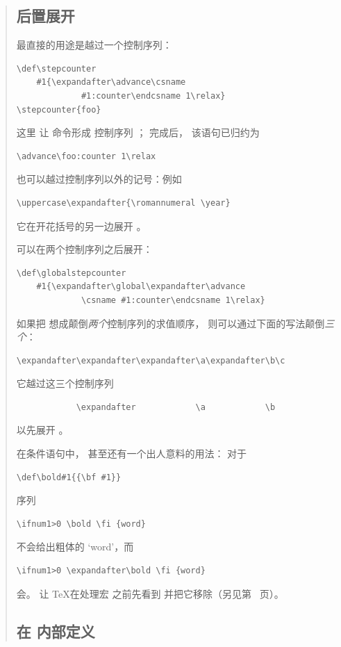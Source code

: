 \documentclass[a4paper]{rapport3}
\newenvironment{disp}{\begin{quotation}}{\end{quotation}}
\begin{document}
\begin{disp}
\subsection{后置展开}

 最直接的用途是越过一个控制序列：
\begin{verbatim}
\def\stepcounter
    #1{\expandafter\advance\csname 
             #1:counter\endcsname 1\relax}
\stepcounter{foo}
\end{verbatim}
这里  让  命令形成
控制序列 ； 完成后，
该语句已归约为
\begin{verbatim}
\advance\foo:counter 1\relax
\end{verbatim}
也可以越过控制序列以外的记号：例如
\begin{verbatim}
\uppercase\expandafter{\romannumeral \year}
\end{verbatim}
它在开花括号的另一边展开 。

可以在两个控制序列之后展开：
\begin{verbatim}
\def\globalstepcounter
    #1{\expandafter\global\expandafter\advance
             \csname #1:counter\endcsname 1\relax}
\end{verbatim}
如果把  想成颠倒{\sl 两个\/}控制序列的求值顺序，
则可以通过下面的写法颠倒{\sl 三个\/}：
\begin{verbatim}
\expandafter\expandafter\expandafter\a\expandafter\b\c 
\end{verbatim}
它越过这三个控制序列
\begin{verbatim}
            \expandafter            \a            \b 
\end{verbatim} 
以先展开 。

在条件语句中， 甚至还有一个出人意料的用法：
对于 \begin{verbatim}
\def\bold#1{{\bf #1}}
\end{verbatim}
序列 \begin{verbatim}
\ifnum1>0 \bold \fi {word}
\end{verbatim}
不会给出粗体的 `word'，而
\begin{verbatim}
\ifnum1>0 \expandafter\bold \fi {word}
\end{verbatim}
会。
 让 \TeX 在处理宏  之前先看到 
并把它移除（另见第~\pageref{after:cond} 页）。

\subsection{在  内部定义}


\end{disp}
\end{document}
